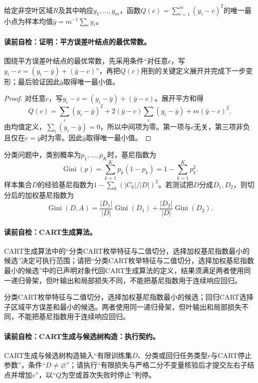 \begin{theorem}[平方误差叶结点的最优常数]\label{thm:V2-C04-leaf-mean}
给定非空叶区域$R$及其中响应$y_1,\ldots,y_m$，函数$Q(c)=\sum_{i=1}^{m}(y_i-c)^2$的唯一最小点为样本均值$\bar y=m^{-1}\sum_i y_i$。
\end{theorem}
\paragraph{读前自检：证明：平方误差叶结点的最优常数。}围绕平方误差叶结点的最优常数，先采用条件“对任意$c$，写$y_i-c=(y_i-\bar y)+(\bar y-c)$”，再把$Q(c)$用到的关键定义展开并完成下一步变形；最后验证因此$\bar y$取得唯一最小值。\par

\begin{proof}
对任意$c$，写$y_i-c=(y_i-\bar y)+(\bar y-c)$。展开平方和得
\[
Q(c)=\sum_i(y_i-\bar y)^2+2(\bar y-c)\sum_i(y_i-\bar y)+m(\bar y-c)^2.
\]
由均值定义，$\sum_i(y_i-\bar y)=0$，所以中间项为零。第一项与$c$无关，第三项非负且仅在$c=\bar y$时为零。因此$\bar y$取得唯一最小值。
\end{proof}

分类问题中，类别概率为$p_1,\ldots,p_K$时，基尼指数为
\[
\operatorname{Gini}(p)=\sum_{k=1}^{K}p_k(1-p_k)=1-\sum_{k=1}^{K}p_k^2.
\]
样本集合$D$的经验基尼指数为$1-\sum_k(|C_k|/|D|)^2$。若测试把$D$分成$D_1,D_2$，则切分后的加权基尼指数为
\[
\operatorname{Gini}(D,A)=\frac{|D_1|}{|D|}\operatorname{Gini}(D_1)
+\frac{|D_2|}{|D|}\operatorname{Gini}(D_2).
\]

\paragraph{读前自检：CART生成算法。}CART生成算法中的“分类CART枚举特征与二值切分，选择加权基尼指数最小的候选”决定可执行范围；请把“分类CART枚举特征与二值切分，选择加权基尼指数最小的候选”中的已声明对象代回CART生成算法的定义，结果须满足两者使用同一递归骨架，但叶输出和局部损失不同，不能把基尼指数用于连续响应回归。\par

分类CART枚举特征与二值切分，选择加权基尼指数最小的候选；回归CART选择子区域平方误差和最小的候选。两者使用同一递归骨架，但叶输出和局部损失不同，不能把基尼指数用于连续响应回归。

\paragraph{读前自检：CART生成与候选树构造：执行契约。}CART生成与候选树构造输入“有限训练集$D$、分类或回归任务类型$r$与CART停止参数”，条件“$D\ne\varnothing$”；请执行“有限损失与严格二分不变量核验后才提交左右子结点并增加$v$”，以“$Q$为空或首次失败时停止”判停。\par
